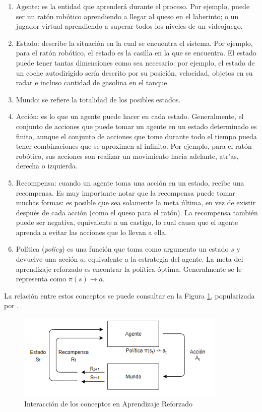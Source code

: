 \begin{enumerate}
    \item Agente: es la entidad que aprender\'a durante el proceso. Por ejemplo, puede ser un rat\'on rob\'otico aprendiendo a llegar al queso en el laberinto; o un jugador virtual aprendiendo a superar todos los niveles de un videojuego.
    \item Estado: describe la situaci\'on en la cual se encuentra el sistema. Por ejemplo, para el rat\'on rob\'otico, el estado es la casilla en la que se encuentra. El estado puede tener tantas dimensiones como sea necesario: por ejemplo, el estado de un coche autodirigido ser\'ia descrito por su posici\'on, velocidad, objetos en su radar e incluso cantidad de gasolina en el tanque.
    \item Mundo: se refiere la totalidad de los posibles estados.
    \item Acci\'on: es lo que un agente puede hacer en cada estado. Generalmente, el conjunto de acciones que puede tomar un agente en un estado determinado es finito, aunque el conjunto de acciones que tome durante todo el tiempo pueda tener combinaciones que se aproximen al infinito. Por ejemplo, para el rat\'on rob\'otico, sus acciones son realizar un movimiento hacia adelante, atr'as, derecha o izquierda.
    \item Recompensa: cuando un agente toma una acci\'on en un estado, recibe una recompensa. Es muy importante notar que la recompensa puede tomar muchas formas: es posible que sea solamente la meta \'ultima, en vez de existir despu\'es de cada acci\'on (como el queso para el rat\'on). La recompensa tambi\'en puede ser negativa, equivalente a un castigo, lo cual causa que el agente aprenda a evitar las acciones que lo llevan a ella.
    \item Pol\'itica (\textit{policy}) es una funci\'on que toma como argumento un estado $s$ y devuelve una acci\'on $a$; equivalente a la estrategia del agente. La meta del aprendizaje reforzado es encontrar la pol\'itica \'optima. Generalmente se le representa como $\pi(s)\rightarrow a$.
\end{enumerate}

La relaci\'on entre estos conceptos se puede consultar en la Figura \ref{rl_concepts}, popularizada por \citet{Sutton}.\\

\begin{figure}[ht]
\caption{Interacci\'on de los conceptos en Aprendizaje Reforzado}
\label{rl_concepts}
\includegraphics[width=10cm]{tesis_tex/figs/rl_concepts.PNG}
\centering
\end{figure}

